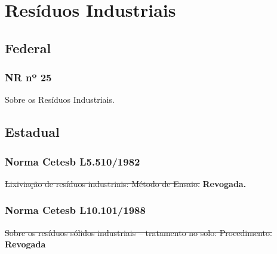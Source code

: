 \section{Resíduos Industriais}
\begin{subapend}
	\subsection{Federal}
	\begin{subsubapend}
		\item \subsubsection{NR nº 25}
		Sobre os Resíduos Industriais.
	\end{subsubapend}
\end{subapend}

\begin{subapend}
	\subsection{Estadual}
	\begin{subsubapend}
		\item \subsubsection{Norma Cetesb L5.510/1982}
		\sout{Lixiviação de resíduos industriais: Método de Ensaio.} \textbf{Revogada.} 
		\subsubsection{Norma Cetesb L10.101/1988}
		\sout{Sobre os resíduos sólidos industriais – tratamento no solo: Procedimento.}  \textbf{Revogada}
	\end{subsubapend}
\end{subapend}

